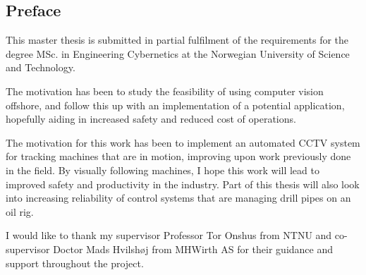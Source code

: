 \subsection*{Preface}
This master thesis is submitted in partial fulfilment of the requirements for the degree MSc. in Engineering Cybernetics at the Norwegian University of Science and Technology.

The motivation has been to study the feasibility of using computer vision offshore, and follow this up with an implementation of a potential application, hopefully aiding in increased safety and reduced cost of operations.

The motivation for this work has been to implement an automated CCTV system for tracking machines that are in motion, improving upon work previously done in the field. By visually following machines, I hope this work will lead to improved safety and productivity in the industry. Part of this thesis will also look into increasing reliability of control systems that are managing drill pipes on an oil rig.

I would like to thank my supervisor Professor Tor Onshus from NTNU and co-supervisor Doctor Mads Hvilshøj from MHWirth AS for their guidance and support throughout the project.

\newpage
